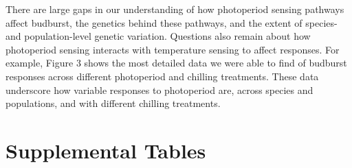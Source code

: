 \documentclass{article}
\begin{document}
\par There are large gaps in our understanding of how photoperiod sensing pathways affect budburst, the genetics behind these pathways, and the extent of species- and population-level genetic variation. Questions also remain about how photoperiod sensing interacts with temperature sensing to affect responses. For example, Figure 3 shows the most detailed data we were able to find of budburst responses across different photoperiod and chilling treatments. These data underscore how variable responses to photoperiod are, across species and populations, and with different chilling treatments. 



\section* {Supplemental Tables}
\end{document}
